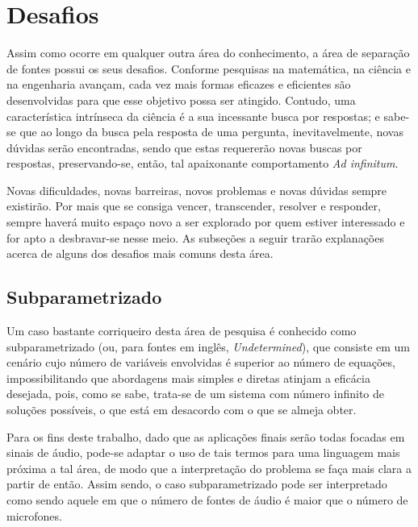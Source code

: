 


\section{Desafios}
\label{sec:intro_challenges}

Assim como ocorre em qualquer outra área do conhecimento, a área de separação de fontes possui os seus desafios. Conforme pesquisas na matemática, na ciência e na engenharia avançam, cada vez mais formas eficazes e eficientes são desenvolvidas para que esse objetivo possa ser atingido. Contudo, uma característica intrínseca da ciência é a sua incessante busca por respostas; e sabe-se que ao longo da busca pela resposta de uma pergunta, inevitavelmente, novas dúvidas serão encontradas, sendo que estas requererão novas buscas por respostas, preservando-se, então, tal apaixonante comportamento \textit{Ad infinitum}.

Novas dificuldades, novas barreiras, novos problemas e novas dúvidas sempre existirão. Por mais que se consiga vencer, transcender, resolver e responder, sempre haverá muito espaço novo a ser explorado por quem estiver interessado e for apto a desbravar-se nesse meio. As subseções a seguir trarão explanações acerca de alguns dos desafios mais comuns desta área.



\subsection{Subparametrizado}
\label{subsec:intro_under-determined}

Um caso bastante corriqueiro desta área de pesquisa é conhecido como subparametrizado (ou, para fontes em inglês, \textit{Undetermined}), que consiste em um cenário cujo número de variáveis envolvidas é superior ao número de equações, impossibilitando que abordagens mais simples e diretas atinjam a eficácia desejada, pois, como se sabe, trata-se de um sistema com número infinito de soluções possíveis, o que está em desacordo com o que se almeja obter.

Para os fins deste trabalho, dado que as aplicações finais serão todas focadas em sinais de áudio, pode-se adaptar o uso de tais termos para uma linguagem mais próxima a tal área, de modo que a interpretação do problema se faça mais clara a partir de então. Assim sendo, o caso subparametrizado pode ser interpretado como sendo aquele em que o número de fontes de áudio é maior que o número de microfones.

